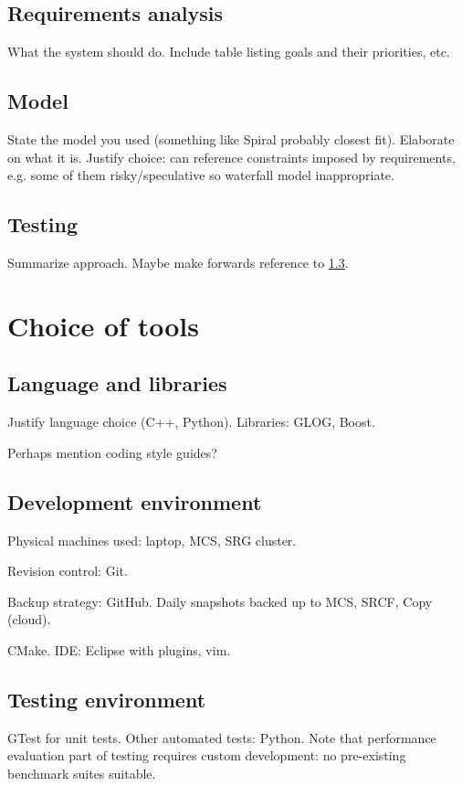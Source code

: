 \subsection{Requirements analysis} \label{sec:prep-sweng-requirements}
What the system should do. Include table listing goals and their priorities, etc.

\subsection{Model}
State the model you used (something like Spiral probably closest fit). Elaborate on what it is. Justify choice: can reference constraints imposed by requirements, e.g. some of them risky/speculative so waterfall model inappropriate.

\subsection{Testing}
Summarize approach. Maybe make forwards reference to \ref{sec:prep-tools-testing}.

\section{Choice of tools} \label{sec:prep-tool-choice}
\subsection{Language and libraries}
Justify language choice (C++, Python). Libraries: GLOG, Boost.

Perhaps mention coding style guides?

\subsection{Development environment}
Physical machines used: laptop, MCS, SRG cluster.

Revision control: Git.

Backup strategy: GitHub. Daily snapshots backed up to MCS, SRCF, Copy (cloud).

CMake. IDE: Eclipse with plugins, vim.

\subsection{Testing environment} \label{sec:prep-tools-testing}
GTest for unit tests. Other automated tests: Python. Note that performance evaluation part of testing requires custom development: no pre-existing benchmark suites suitable.

